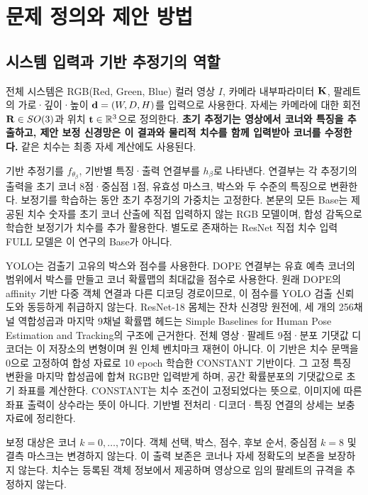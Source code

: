 \section{문제 정의와 제안 방법}\label{sec:method}
\subsection{시스템 입력과 기반 추정기의 역할}

전체 시스템은 RGB(Red, Green, Blue) 컬러 영상 $I$, 카메라 내부파라미터 $\mathbf K$, 팔레트의 가로·깊이·높이 $\mathbf d=(W,D,H)$를 입력으로 사용한다. 자세는 카메라에 대한 회전 $\mathbf R\in SO(3)$과 위치 $\mathbf t\in\mathbb R^3$으로 정의한다. \textbf{초기 추정기는 영상에서 코너와 특징을 추출하고, 제안 보정 신경망은 이 결과와 물리적 치수를 함께 입력받아 코너를 수정한다.} 같은 치수는 최종 자세 계산에도 사용된다.

기반 추정기를 $f_{\theta_\beta}$, 기반별 특징·출력 연결부를 $h_\beta$로 나타낸다. 연결부는 각 추정기의 출력을 초기 코너 8점·중심점 1점, 유효성 마스크, 박스와 두 수준의 특징으로 변환한다. 보정기를 학습하는 동안 초기 추정기의 가중치는 고정한다. 본문의 모든 Base는 제공된 치수 숫자를 초기 코너 산출에 직접 입력하지 않는 RGB 모델이며, 합성 감독으로 학습한 보정기가 치수를 추가 활용한다. 별도로 존재하는 ResNet 직접 치수 입력 FULL 모델은 이 연구의 Base가 아니다.

YOLO는 검출기 고유의 박스와 점수를 사용한다. DOPE 연결부는 유효 예측 코너의 범위에서 박스를 만들고 코너 확률맵의 최대값을 점수로 사용한다. 원래 DOPE의 affinity 기반 다중 객체 연결과 다른 디코딩 경로이므로, 이 점수를 YOLO 검출 신뢰도와 동등하게 취급하지 않는다. ResNet-18 몸체는 잔차 신경망 원전\cite{resnet2016}에, 세 개의 256채널 역합성곱과 마지막 9채널 확률맵 헤드는 Simple Baselines for Human Pose Estimation and Tracking\cite{simple2018}의 구조에 근거한다. 전체 영상·팔레트 9점·분포 기댓값 디코더는 이 저장소의 변형이며 원 인체 벤치마크 재현이 아니다. 이 기반은 치수 문맥을 0으로 고정하여 합성 자료로 10 epoch 학습한 CONSTANT 기반이다. 그 고정 특징 변환을 마지막 합성곱에 합쳐 RGB만 입력받게 하며, 공간 확률분포의 기댓값으로 초기 좌표를 계산한다. CONSTANT는 치수 조건이 고정되었다는 뜻으로, 이미지에 따른 좌표 출력이 상수라는 뜻이 아니다. 기반별 전처리·디코더·특징 연결의 상세는 보충자료에 정리한다.

보정 대상은 코너 $k=0,\ldots,7$이다. 객체 선택, 박스, 점수, 후보 순서, 중심점 $k=8$ 및 결측 마스크는 변경하지 않는다. 이 출력 보존은 코너나 자세 정확도의 보존을 보장하지 않는다. 치수는 등록된 객체 정보에서 제공하며 영상으로 임의 팔레트의 규격을 추정하지 않는다.

